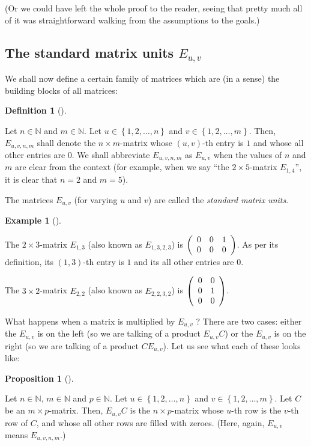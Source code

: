\documentclass[numbers=enddot,12pt,final,onecolumn,notitlepage]{scrartcl}%
\theoremstyle{definition}
\newtheorem{prop}[theo]{Proposition}
\newenvironment{proposition}[1][]
{\begin{prop}[#1]\begin{leftbar}}
{\end{leftbar}\end{prop}}
\newtheorem{defi}[theo]{Definition}
\newenvironment{definition}[1][]
{\begin{defi}[#1]\begin{leftbar}}
{\end{leftbar}\end{defi}}
\newtheorem{exam}[theo]{Example}
\newenvironment{example}[1][]
{\begin{exam}[#1]\begin{leftbar}}
{\end{leftbar}\end{exam}}
\begin{document}
(Or we could have left the whole proof to the reader, seeing that pretty much
all of it was straightforward walking from the assumptions to the goals.)

\subsection{The standard matrix units $E_{u,v}$}

We shall now define a certain family of matrices which are (in a sense) the
building blocks of all matrices:

\begin{definition}
\label{def.Euv}Let $n\in\mathbb{N}$ and $m\in\mathbb{N}$. Let $u\in\left\{
1,2,\ldots,n\right\}  $ and $v\in\left\{  1,2,\ldots,m\right\}  $. Then,
$E_{u,v,n,m}$ shall denote the $n\times m$-matrix whose $\left(  u,v\right)
$-th entry is $1$ and whose all other entries are $0$. We shall abbreviate
$E_{u,v,n,m}$ as $E_{u,v}$ when the values of $n$ and $m$ are clear from the
context (for example, when we say \textquotedblleft the $2\times5$-matrix
$E_{1,4}$\textquotedblright, it is clear that $n=2$ and $m=5$).

The matrices $E_{u,v}$ (for varying $u$ and $v$) are called the
\textit{standard matrix units}.
\end{definition}

\begin{example}
The $2\times3$-matrix $E_{1,3}$ (also known as $E_{1,3,2,3}$) is $\left(
\begin{array}
[c]{ccc}%
0 & 0 & 1\\
0 & 0 & 0
\end{array}
\right)  $. As per its definition, its $\left(  1,3\right)  $-th entry is $1$
and its all other entries are $0$.

The $3\times2$-matrix $E_{2,2}$ (also known as $E_{2,2,3,2}$) is $\left(
\begin{array}
[c]{cc}%
0 & 0\\
0 & 1\\
0 & 0
\end{array}
\right)  $.
\end{example}

What happens when a matrix is multiplied by $E_{u,v}$ ? There are two cases:
either the $E_{u,v}$ is on the left (so we are talking of a product $E_{u,v}%
C$) or the $E_{u,v}$ is on the right (so we are talking of a product
$CE_{u,v}$). Let us see what each of these looks like:

\begin{proposition}
\label{prop.Euv.laction}Let $n\in\mathbb{N}$, $m\in\mathbb{N}$ and
$p\in\mathbb{N}$. Let $u\in\left\{  1,2,\ldots,n\right\}  $ and $v\in\left\{
1,2,\ldots,m\right\}  $. Let $C$ be an $m\times p$-matrix. Then, $E_{u,v}C$ is
the $n\times p$-matrix whose $u$-th row is the $v$-th row of $C$, and whose
all other rows are filled with zeroes. (Here, again, $E_{u,v}$ means
$E_{u,v,n,m}$.)
\end{proposition}
\end{document}
